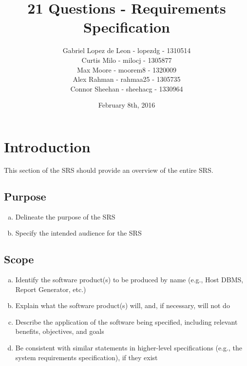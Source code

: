 \documentclass[titlepage]{article}
\title{\textbf{21 Questions - Requirements Specification}}
\author{Gabriel Lopez de Leon - lopezdg - 1310514\\%
Curtis Milo - milocj - 1305877\\%
Max Moore - moorem8 - 1320009\\%
Alex Rahman - rahmaa25 - 1305735\\%
Connor Sheehan - sheehacg - 1330964}
\date{February 8th, 2016}
\begin{document}
	
	\maketitle
	\vspace{4cm}	
		\newpage
		\tableofcontents
		\newpage
		\section{Introduction}
		\label{sec:introduction}
		
		This section of the SRS should provide an overview of the entire SRS.
		
		\subsection{Purpose}
		\label{sub:purpose}
		\begin{enumerate}[a)]
			\item Delineate the purpose of the SRS
			\item Specify the intended audience for the SRS
		\end{enumerate}
		
		\subsection{Scope}
		\label{sub:scope}
		\begin{enumerate}[a)]
			\item Identify the software product(s) to be produced by name (e.g., Host DBMS, Report Generator, etc.)
			\item Explain what the software product(s) will, and, if necessary, will not do
			\item Describe the application of the software being specified, including relevant benefits, objectives, and goals
			\item Be consistent with similar statements in higher-level specifications (e.g., the system requirements specification), if they exist
		\end{enumerate}
		
\end{document}
